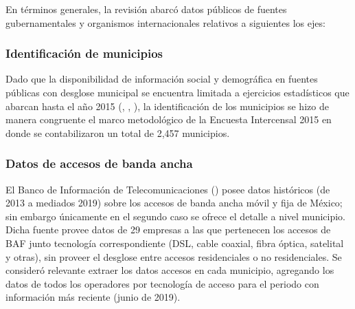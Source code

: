 \documentclass[9pt,twocolumn,twoside]{ilcss}
\begin{document}
En términos generales, la revisión abarcó datos públicos 
de fuentes gubernamentales y organismos internacionales relativos a siguientes los ejes:

\subsubsection{Identificación de municipios}

Dado que la disponibilidad de información social y demográfica en fuentes públicas con desglose municipal se encuentra limitada a ejercicios estadísticos que abarcan hasta el año 2015 (\cite{Intercensal2015}, \cite{CONAPO2015}, \cite{ONU2015}), la identificación de los municipios se hizo de manera congruente el marco metodológico de la Encuesta Intercensal 2015 en donde se contabilizaron un total de 2,457 municipios.

\subsubsection{Datos de accesos de banda ancha}

El Banco de Información de Telecomunicaciones (\cite{IFT2019BIT}) posee datos históricos (de 2013 a mediados 2019) sobre los accesos de banda ancha móvil y fija de México; sin embargo únicamente en el segundo caso se ofrece el detalle a nivel municipio. Dicha fuente provee datos de 29 empresas a las que pertenecen los accesos de BAF junto tecnología correspondiente (DSL, cable coaxial, fibra óptica, satelital y otras), sin proveer el desglose entre accesos residenciales o no residenciales. Se consideró relevante extraer los datos accesos en cada municipio, agregando los datos de todos los operadores por tecnología de acceso para el periodo con información más reciente (junio de 2019).
\end{document}
